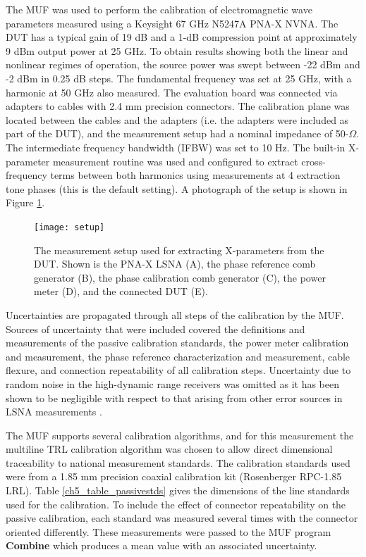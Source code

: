 \documentclass[../thesis/thesis.tex]{subfiles}
\begin{document}
The MUF was used to perform the calibration of electromagnetic wave parameters measured using a Keysight  67 GHz N5247A PNA-X NVNA. The DUT \cite{hittite_amp} has a typical gain of 19 dB and a \mbox{1-dB} compression point at approximately 9 dBm output power at 25 GHz. To obtain results showing both the linear and nonlinear regimes of operation, the source power was swept between -22 dBm and -2 dBm in 0.25 dB steps. The fundamental frequency was set at 25 GHz, with a harmonic at 50 GHz also measured. The evaluation board was connected via adapters to cables with 2.4 mm precision connectors. The calibration plane was located between the cables and the adapters (i.e. the adapters were included as part of the DUT), and the measurement setup had a nominal impedance of 50-$\Omega$. The intermediate frequency bandwidth (IFBW) was set to 10 Hz. The built-in X-parameter measurement routine was used and configured to extract cross-frequency terms between both harmonics using measurements at 4 extraction tone phases (this is the default setting). A photograph of the setup is shown in Figure \ref{ch5_fig_setup}.

\begin{figure}[t]
	\centering
	\texttt{[image: setup]}
	\caption[The measurement setup used for extracting X-parameters from the DUT.]{The measurement setup used for extracting X-parameters from the DUT. Shown is the PNA-X LSNA (A), the phase reference comb generator (B), the phase calibration comb generator (C), the power meter (D), and the connected DUT (E).}
	\label{ch5_fig_setup}
\end{figure}

Uncertainties are propagated through all steps of the calibration by the MUF. Sources of uncertainty that were included covered the definitions and measurements of the passive calibration standards, the power meter calibration and measurement, the phase reference characterization and measurement, cable flexure, and connection repeatability of all calibration steps. Uncertainty due to random noise in the high-dynamic range receivers was omitted as it has been shown to be negligible with respect to that arising from other error sources in LSNA measurements \cite{Blockley_2007}.

The MUF supports several calibration algorithms, and for this measurement the multiline TRL calibration algorithm \cite{Engen_1979, Marks_1991} was chosen to allow direct dimensional traceability to national measurement standards. The calibration standards used were from a 1.85 mm precision coaxial calibration kit (Rosenberger RPC-1.85 LRL). Table \ref{ch5_table_passivestds} gives the dimensions of the line standards used for the calibration. To include the effect of connector repeatability on the passive calibration, each standard was measured several times with the connector oriented differently. These measurements were passed to the MUF program \textbf{Combine} which produces a mean value with an associated uncertainty.
\end{document}
